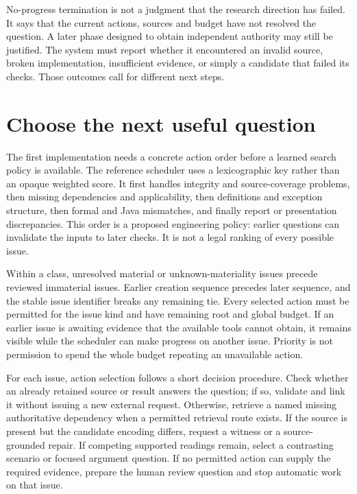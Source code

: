 \documentclass[12pt,a4paper,oneside,openany]{book}
\begin{document}
No-progress termination is not a judgment that the research direction has failed.
It says that the current actions, sources and budget have not resolved the
question. A later phase designed to obtain independent authority may still be
justified. The system must report whether it encountered an invalid source,
broken implementation, insufficient evidence, or simply a candidate that failed
its checks. Those outcomes call for different next steps.

\section{Choose the next useful question}
\label{merge:M06:14}


The first implementation needs a concrete action order before a learned search
policy is available. The reference scheduler uses a lexicographic key rather
than an opaque weighted score. It first handles integrity and source-coverage
problems, then missing dependencies and applicability, then definitions and
exception structure, then formal and Java mismatches, and finally report or
presentation discrepancies. This order is a proposed engineering policy: earlier
questions can invalidate the inputs to later checks. It is not a legal ranking
of every possible issue.

Within a class, unresolved material or unknown-materiality issues precede reviewed
immaterial issues. Earlier creation sequence precedes later sequence, and the
stable issue identifier breaks any remaining tie. Every selected action must be
permitted for the issue kind and have remaining root and global budget. If an
earlier issue is awaiting evidence that the available tools cannot obtain, it
remains visible while the scheduler can make progress on another issue. Priority
is not permission to spend the whole budget repeating an unavailable action.

For each issue, action selection follows a short decision procedure. Check whether
an already retained source or result answers the question; if so, validate and
link it without issuing a new external request. Otherwise, retrieve a named
missing authoritative dependency when a permitted retrieval route exists. If the
source is present but the candidate encoding differs, request a witness or a
source-grounded repair. If competing supported readings remain, select a
contrasting scenario or focused argument question. If no permitted action can
supply the required evidence, prepare the human review question and stop automatic
work on that issue.
\end{document}
